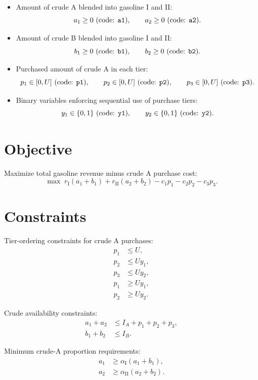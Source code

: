 \begin{itemize}
    \item Amount of crude A blended into gasoline I and II:
    \[
    a_1 \ge 0 \text{ (code: \texttt{a1})}, \qquad
    a_2 \ge 0 \text{ (code: \texttt{a2})}.
    \]
    \item Amount of crude B blended into gasoline I and II:
    \[
    b_1 \ge 0 \text{ (code: \texttt{b1})}, \qquad
    b_2 \ge 0 \text{ (code: \texttt{b2})}.
    \]
    \item Purchased amount of crude A in each tier:
    \[
    p_1 \in [0,U] \text{ (code: \texttt{p1})}, \qquad
    p_2 \in [0,U] \text{ (code: \texttt{p2})}, \qquad
    p_3 \in [0,U] \text{ (code: \texttt{p3})}.
    \]
    \item Binary variables enforcing sequential use of purchase tiers:
    \[
    y_1 \in \{0,1\} \text{ (code: \texttt{y1})}, \qquad
    y_2 \in \{0,1\} \text{ (code: \texttt{y2})}.
    \]
\end{itemize}

\section*{Objective}

Maximize total gasoline revenue minus crude A purchase cost:
\[
\max \;
r_{\mathrm{I}}(a_1+b_1) + r_{\mathrm{II}}(a_2+b_2)
- c_1 p_1 - c_2 p_2 - c_3 p_3.
\]

\section*{Constraints}

Tier-ordering constraints for crude A purchases:
\begin{align}
p_1 &\le U, \\
p_2 &\le U y_1, \\
p_3 &\le U y_2, \\
p_1 &\ge U y_1, \\
p_2 &\ge U y_2.
\end{align}

Crude availability constraints:
\begin{align}
a_1 + a_2 &\le I_A + p_1 + p_2 + p_3, \\
b_1 + b_2 &\le I_B.
\end{align}

Minimum crude-A proportion requirements:
\begin{align}
a_1 &\ge \alpha_{\mathrm{I}}(a_1+b_1), \\
a_2 &\ge \alpha_{\mathrm{II}}(a_2+b_2).
\end{align}

